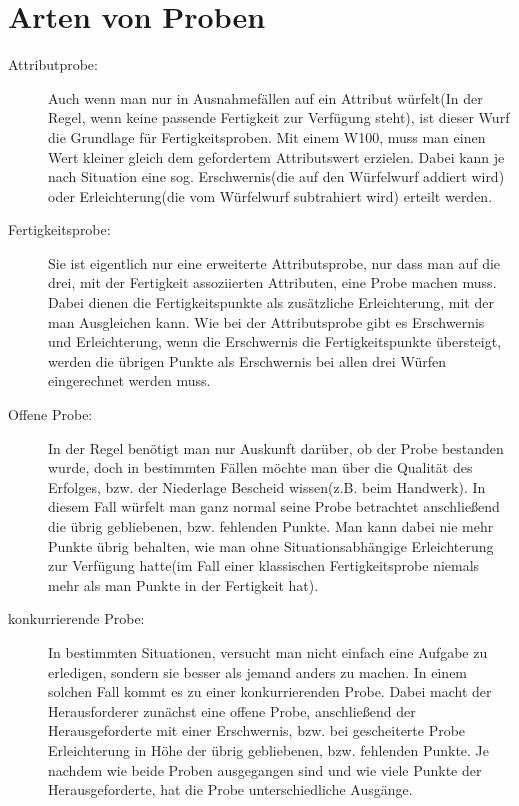 \documentclass[a4paper,12pt,oneside]{book}
\begin{document}
\section{Arten von Proben}
\begin{description}
\item[Attributprobe:]Auch wenn man nur in Ausnahmefällen auf ein Attribut würfelt(In der Regel, wenn keine passende Fertigkeit zur Verfügung steht), ist dieser Wurf die Grundlage für Fertigkeitsproben. Mit einem W100, muss man einen Wert kleiner gleich dem gefordertem Attributswert erzielen. Dabei kann je nach Situation eine sog. Erschwernis(die auf den Würfelwurf addiert wird) oder Erleichterung(die vom Würfelwurf subtrahiert wird) erteilt werden. 
\item[Fertigkeitsprobe:]
Sie ist eigentlich nur eine erweiterte Attributsprobe, nur dass man auf die drei, mit der Fertigkeit assoziierten Attributen, eine Probe machen muss. Dabei dienen die Fertigkeitspunkte als zusätzliche Erleichterung, mit der man Ausgleichen kann. Wie bei der Attributsprobe gibt es Erschwernis und Erleichterung, wenn die Erschwernis die Fertigkeitspunkte übersteigt, werden die übrigen Punkte als Erschwernis bei allen drei Würfen eingerechnet werden muss.
\item[Offene Probe:]
In der Regel benötigt man nur Auskunft darüber, ob der Probe bestanden wurde, doch in bestimmten Fällen möchte man über die Qualität des Erfolges, bzw. der Niederlage Bescheid wissen(z.B. beim Handwerk). In diesem Fall würfelt man ganz normal seine Probe betrachtet anschließend die übrig gebliebenen, bzw. fehlenden Punkte. Man kann dabei nie mehr Punkte übrig behalten, wie man ohne Situationsabhängige Erleichterung zur Verfügung hatte(im Fall einer klassischen Fertigkeitsprobe niemals mehr als man Punkte in der Fertigkeit hat).
\item[konkurrierende Probe:]
In bestimmten Situationen, versucht man nicht einfach eine Aufgabe zu erledigen, sondern sie besser als jemand anders zu machen. In einem solchen Fall kommt es zu einer konkurrierenden Probe. Dabei macht der Herausforderer zunächst eine offene Probe, anschließend der Herausgeforderte mit einer Erschwernis, bzw. bei gescheiterte Probe Erleichterung in Höhe der übrig gebliebenen, bzw. fehlenden Punkte. Je nachdem wie beide Proben ausgegangen sind und wie viele Punkte der Herausgeforderte, hat die Probe unterschiedliche Ausgänge. 
\end{description}
\end{document}
